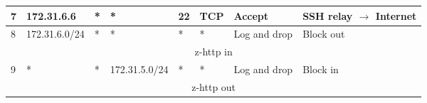 \documentclass[a4paper, 11pt, oneside]{article}
\begin{document}
\begin{table}[H]
{\begin{tabular}{|llllllll|}
\multicolumn{1}{|l|}{7}           & \multicolumn{1}{l|}{172.31.6.6}                                                   & \multicolumn{1}{l|}{*}                                                              & \multicolumn{1}{l|}{*}                                                                 & \multicolumn{1}{l|}{22}                                                                  & \multicolumn{1}{l|}{TCP}               & \multicolumn{1}{l|}{Accept}          & SSH relay $\rightarrow$ Internet       \\ \hline
\multicolumn{1}{|l|}{8}           & \multicolumn{1}{l|}{172.31.6.0/24}                                                & \multicolumn{1}{l|}{*}                                                              & \multicolumn{1}{l|}{*}                                                                 & \multicolumn{1}{l|}{*}                                                                   & \multicolumn{1}{l|}{*}                 & \multicolumn{1}{l|}{Log and drop}    & Block out                              \\ \hline
\multicolumn{8}{|c|}{{\color[HTML]{FE0000} z-http in}}                                                                                                                                                                                                                                                                                                                                                                                                                                                                   \\ \hline
\multicolumn{1}{|l|}{9}           & \multicolumn{1}{l|}{*}                                                            & \multicolumn{1}{l|}{*}                                                              & \multicolumn{1}{l|}{172.31.5.0/24}                                                     & \multicolumn{1}{l|}{*}                                                                   & \multicolumn{1}{l|}{*}                 & \multicolumn{1}{l|}{Log and drop}    & Block in                               \\ \hline
\multicolumn{8}{|c|}{{\color[HTML]{FE0000} z-http out}}                                                                                                                                                                                                                                                                                                                                                                                                                                                                  \\ \hline

\end{tabular}}
\end{table}
\end{document}
